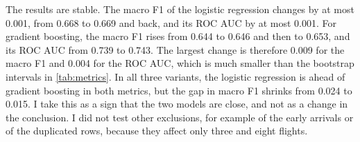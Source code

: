 

The results are stable. The macro F1 of the logistic regression changes by at most 0.001, from 0.668 to 0.669 and back, and its ROC AUC by at most 0.001. For gradient boosting, the macro F1 rises from 0.644 to 0.646 and then to 0.653, and its ROC AUC from 0.739 to 0.743. The largest change is therefore 0.009 for the macro F1 and 0.004 for the ROC AUC, which is much smaller than the bootstrap intervals in \cref{tab:metrics}. In all three variants, the logistic regression is ahead of gradient boosting in both metrics, but the gap in macro F1 shrinks from 0.024 to 0.015. I take this as a sign that the two models are close, and not as a change in the conclusion. I did not test other exclusions, for example of the early arrivals or of the duplicated rows, because they affect only three and eight flights.
